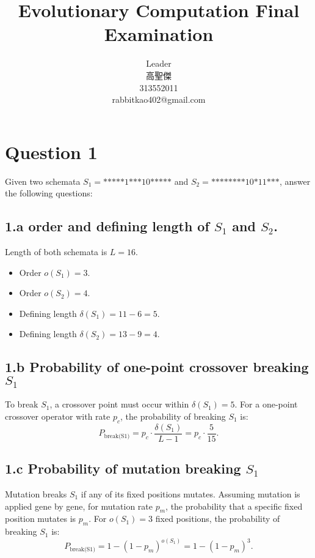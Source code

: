 \documentclass[12pt,letterpaper]{article}
\begin{document}
\begin{CJK}{UTF8}{bkai}
    \title{Evolutionary Computation Final Examination}
    
    \author{
        Leader\\
        高聖傑\\
        313552011\\
        rabbitkao402@gmail.com
    }

    \maketitle
\end{CJK}

\section*{Question 1}
Given two schemata \( S_1 = \text{*****1***10*****} \) and \( S_2 = \text{********10*11***} \), answer the following questions:
\subsection*{1.a order and defining length of \( S_1 \) and \( S_2 \).}
Length of both schemata is \( L = 16 \).
\begin{itemize}
    \item Order \( o(S_1) = 3 \).
    \item Order \( o(S_2) = 4 \).
    \item Defining length \( \delta(S_1) = 11 - 6 = 5 \).
    \item Defining length \( \delta(S_2) = 13 - 9 = 4 \).
\end{itemize}

\subsection*{1.b Probability of one-point crossover breaking \( S_1 \)}
To break \( S_1 \), a crossover point must occur within \( \delta(S_1) = 5 \).
For a one-point crossover operator with rate \( p_c \), the probability of breaking \( S_1 \) is:
\[
P_{\text{break(S1)}} = p_c \cdot \frac{\delta(S_1)}{L - 1} = p_c \cdot \frac{5}{15}.
\]

\subsection*{1.c Probability of mutation breaking \( S_1 \)}
Mutation breaks \( S_1 \) if any of its fixed positions mutates.
Assuming mutation is applied gene by gene, for mutation rate \( p_m \), the probability that a specific fixed position mutates is \( p_m \).
For \( o(S_1) = 3 \) fixed positions, the probability of breaking \( S_1 \) is:
  \[
  P_{\text{break(S1)}} = 1 - (1 - p_m)^{o(S_1)} = 1 - (1 - p_m)^3.
  \]
\end{document}
